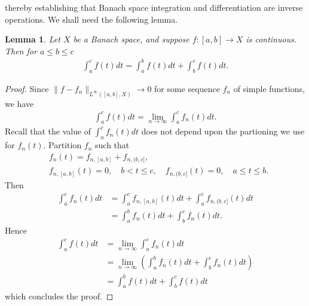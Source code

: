 \documentclass[12pt,reqno]{amsart}
\numberwithin{equation}{section}  %
\numberwithin{figure}{section}
\theoremstyle{plain}
\newtheorem{lemma}{Lemma}
\theoremstyle{definition}
\theoremstyle{remark}
\begin{document}
thereby establishing that Banach space integration and
differentiation are inverse operations. We shall need the following lemma.
%
%
%
%
%
%
%
%
%
%
\begin{lemma}
  Let $X$ be a Banach space, and suppose $f: [a,b] \to X$ is continuous. Then for
  $a \le b \le c$ 
%
%
\begin{equation*}
\begin{split}
  \int_{a}^{c} f(t) dt = \int_{a}^{b} f(t) dt + \int_{b}^{c} f(t) dt.
\end{split}
\end{equation*}
%
%
\label{lem:int-splitting}
\end{lemma}
%
%
%
%
\begin{proof}
  Since $\| f - f_{n} \|_{L^{\infty}\left( [a,b], X \right)} \to 0$ for some sequence
  $f_{n}$ of simple functions, we have
  \begin{equation*}
  \begin{split}
    \int_{a}^{c} f(t) dt = \lim_{n \to \infty} \int_{a}^{c} f_{n}(t) dt.
  \end{split}
  \end{equation*}
  Recall that the value of $\int_{a}^{c}f_{n}(t) dt$ does not depend upon the
  partioning we use for $f_{n}(t)$. Partition $f_{n}$ such that
  \begin{equation}
    \begin{split}
  & f_{n}(t) = f_{n, [a,b]} + f_{n, (b, c]},  
    \\
    & f_{n, [a,b]}(t) =0, \quad b< t \le c, \quad f_{n, (b, c]}(t) = 0, \quad
    a \le t \le b.
\end{split}
\end{equation}
Then
  \begin{equation*}
  \begin{split}
    \int_{a}^{c} f_{n}(t) dt & = \int_{a}^{c} f_{n, [a,b]}(t)dt  +
    \int_{a}^{c} f_{n, (b,c]}(t)dt 
    \\
    & = \int_{a}^{b} f_{n}(t)dt  +
    \int_{b}^{c} f_{n}(t)dt.
  \end{split}
  \end{equation*}
Hence 
 \begin{equation*}
 \begin{split}
   \int_{a}^{c} f(t) dt 
   & = \lim_{n \to \infty} \int_{a}^{c} f_{n}(t) dt
   \\
   &= \lim_{n \to \infty} \left ( \int_{a}^{b} f_{n}(t)dt  +
    \int_{b}^{c} f_{n}(t)dt \right )
    \\
    & =\int_{a}^{b} f(t) dt + \int_{b}^{c} f(t) dt
 \end{split}
 \end{equation*}
which concludes the proof.
\end{proof}
\end{document}
